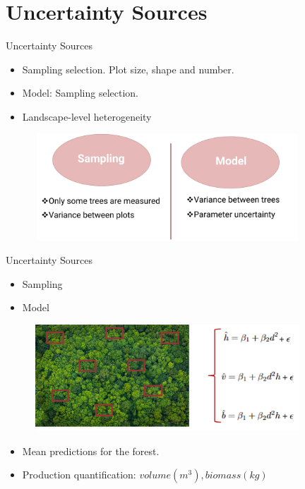\documentclass{beamer}
\begin{document}
\section{Uncertainty Sources}
\begin{frame}{Uncertainty Sources}

\begin{itemize}
    \item Sampling selection. Plot size, shape and number.
    \item Model: Sampling selection.
    \item Landscape-level heterogeneity
\end{itemize}
\begin{figure}
        \centering
        \includegraphics[width = 10cm, height = 4cm]{pic/Imagem8.jpg}
        \end{figure}  
\end{frame}

\begin{frame}{Uncertainty Sources}
\begin{itemize}
    \item Sampling
    \item Model
\end{itemize}
\begin{figure}
        \centering
        \includegraphics[width = 10cm, height = 4cm]{pic/primeirodia.jpg}
        \end{figure} 
\begin{itemize}
    \item Mean predictions for the forest.
    \item Production quantification: $volume (m^3), biomass (kg)$
\end{itemize}
\end{frame}
\end{document}

